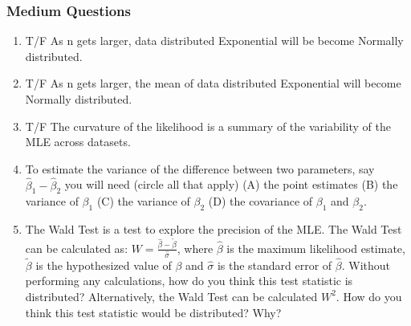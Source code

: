 \documentclass[11pt]{article}
\begin{document}
\subsubsection{Medium Questions}
\begin{enumerate}
\item T/F As n gets larger, data distributed Exponential will be become Normally distributed. 

\item T/F As n gets larger, the mean of data distributed Exponential will become Normally distributed. 

\item T/F The curvature of the likelihood is a summary of the variability of the MLE across datasets. 

\item To estimate the variance of the difference between two parameters, say $\hat{\beta}_1 - \hat{\beta}_2$ you will need (circle all that apply) (A) the point estimates (B) the variance of $\beta_1$ (C) the variance of $\beta_2$ (D) the covariance of $\beta_1$ and $\beta_2$. 

\item The Wald Test is a test to explore the precision of the MLE.  The Wald Test can be calculated as: $W = \frac{\hat{\beta} - \tilde{\beta}}{\hat{\sigma}}$, where $\hat{\beta}$ is the maximum likelihood estimate, $\tilde{\beta}$ is the hypothesized value of $\beta$ and $\hat{\sigma}$ is the standard error of $\hat{\beta}$.  Without performing any calculations, how do you think this test statistic is distributed?  Alternatively, the Wald Test can be calculated $W^2$.  How do you think this test statistic would be distributed?  Why? 
\end{enumerate}
\end{document}
